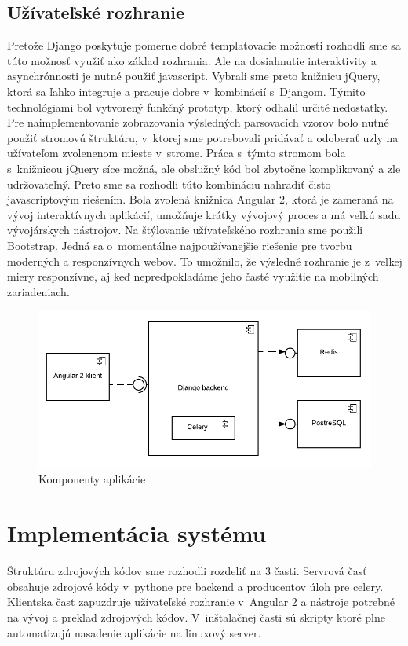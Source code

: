 \subsection{Užívateľské rozhranie}
Pretože Django poskytuje pomerne dobré templatovacie možnosti rozhodli sme sa túto možnosť využiť ako základ rozhrania. Ale na dosiahnutie interaktivity a asynchrónnosti je nutné použiť javascript. Vybrali sme preto knižnicu jQuery, ktorá sa ľahko integruje a pracuje dobre v~kombinácií s~Djangom. Týmito technológiami bol vytvorený funkčný prototyp, ktorý odhalil určité nedostatky. Pre naimplementovanie zobrazovania výsledných parsovacích vzorov bolo nutné použiť stromovú štruktúru, v~ktorej sme potrebovali pridávať a odoberať uzly na užívateľom zvolenenom mieste v~strome. Práca s~týmto stromom bola s~knižnicou jQuery síce možná, ale obslužný kód bol zbytočne komplikovaný a zle udržovateľný. Preto sme sa rozhodli túto kombináciu nahradiť čisto javascriptovým riešením. Bola zvolená knižnica Angular 2, ktorá je zameraná na vývoj interaktívnych aplikácií, umožňuje krátky vývojový proces a má veľkú sadu vývojárskych nástrojov.
Na štýlovanie užívateľského rozhrania sme použili Bootstrap. Jedná sa o~momentálne najpoužívanejšie riešenie pre tvorbu moderných a responzívnych webov. To umožnilo, že výsledné rozhranie je z~veľkej miery responzívne, aj keď nepredpokladáme jeho časté využitie na mobilných zariadeniach.

\begin{figure}[htbp]
 \centering 
 \begin{minipage}{0.95\linewidth}
 	\centering
 	\includegraphics[width=\textwidth]{Images/thesis-component-diagram.pdf}	
 \end{minipage}
  \caption{Komponenty aplikácie }
  \label{fig:components}
\end{figure}

\section{Implementácia systému}
Štruktúru zdrojových kódov sme rozhodli rozdeliť na 3 časti. Servrová časť obsahuje zdrojové kódy v~pythone pre backend a producentov úloh pre celery. Klientska čast zapuzdruje užívateľské rozhranie v~Angular 2 a nástroje potrebné na vývoj a preklad zdrojových kódov. V~inštalačnej časti sú skripty ktoré plne automatizujú nasadenie aplikácie na linuxový server.